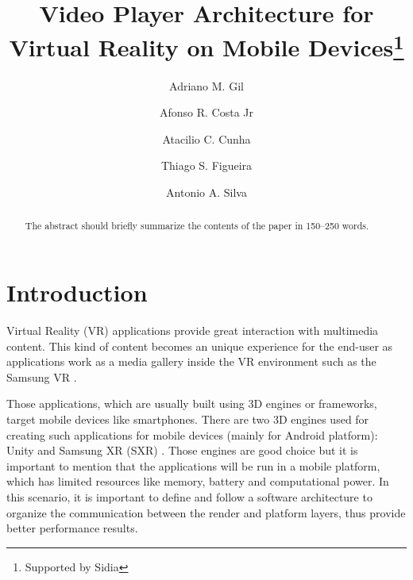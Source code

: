 \documentclass[runningheads]{llncs}
\begin{document}
%
\title{Video Player Architecture for Virtual Reality on Mobile Devices\thanks{Supported by Sidia}}
%
%
\author{Adriano M. Gil \and
Afonso R. Costa Jr \and
Atacilio C. Cunha \and
Thiago S. Figueira \and
Antonio A. Silva}


%
%
%
\maketitle              %
%
\begin{abstract}
The abstract should briefly summarize the contents of the paper in
150--250 words.

\end{abstract}
%
%
%
\section{Introduction}

Virtual Reality (VR) applications provide great interaction with multimedia content. This kind of content becomes an unique experience for the end-user as applications work as a media gallery inside the VR environment such as the Samsung VR \cite{SVR}.

Those applications, which are usually built using 3D engines or frameworks, target mobile devices like smartphones. There are two 3D engines used for creating such applications for mobile devices (mainly for Android platform): Unity \cite{Unity} and Samsung XR (SXR) \cite{SXR}. Those engines are good choice but it is important to mention that the applications will be run in a mobile platform, which has limited resources like memory, battery and computational power. In this scenario, it is important to define and follow a software architecture to organize the communication between the render and platform layers, thus provide better performance results.
\end{document}
